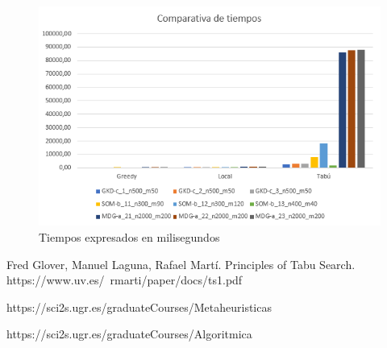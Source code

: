 \documentclass{article}
\begin{document}
			
			\begin{figure}[H]
				
				\centering
				\includegraphics[scale=0.4]{img/TiemposGlobal}
				\caption{Tiempos expresados en milisegundos}
				
			\end{figure}
			


	\begin{thebibliography}{0}
		
		 Fred Glover, Manuel Laguna, Rafael Martí. Principles of Tabu Search. https://www.uv.es/~rmarti/paper/docs/ts1.pdf
		
		 https://sci2s.ugr.es/graduateCourses/Metaheuristicas
		
		https://sci2s.ugr.es/graduateCourses/Algoritmica
		
	\end{thebibliography}
\end{document}
